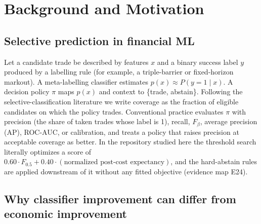 \documentclass[10pt]{article}
\begin{document}
\section{Background and Motivation}

\subsection{Selective prediction in financial ML}

Let a candidate trade be described by features $x$ and a binary success label $y$ produced by a labelling rule (for example, a triple-barrier or fixed-horizon markout). A meta-labelling classifier estimates $p(x)\approx P(y=1\mid x)$. A decision policy $\pi$ maps $p(x)$ and context to \{trade, abstain\}. Following the selective-classification literature we write coverage as the fraction of eligible candidates on which the policy trades. Conventional practice evaluates $\pi$ with precision (the share of taken trades whose label is 1), recall, $F_\beta$, average precision (AP), ROC-AUC, or calibration, and treats a policy that raises precision at acceptable coverage as better. In the repository studied here the threshold search literally optimizes a score of $0.60\cdot F_{0.5}+0.40\cdot(\text{normalized post-cost expectancy})$, and the hard-abstain rules are applied downstream of it without any fitted objective (evidence map E24).

\subsection{Why classifier improvement can differ from economic improvement}
\end{document}
